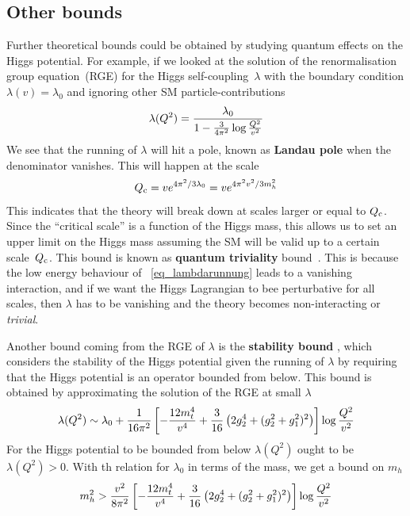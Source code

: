 \subsection{Other bounds}
\par Further theoretical bounds could be obtained by studying quantum effects on the Higgs potential. For example, if we looked at the solution of the renormalisation group equation~(RGE) for the Higgs self-coupling~$\lambda$ with the boundary condition $ \lambda(v)=\lambda_0$ and ignoring other SM particle-contributions
\begin{equation}
	\lambda (Q^2) = \frac{\lambda_0}{1-\frac{3}{4 \pi^2} \log {Q^2\over v^2}}
	\label{eq_lambdarunnung}
\end{equation}
We see that the running of $\lambda$ will hit a pole, known as \textbf{Landau pole} when the denominator vanishes. This will happen at the scale
\begin{equation}
	Q_{{\rm c}} = v e^{4 \pi^2/3 \lambda_0} =  v e^{4 \pi^2 v^2/3 m_h^2}
\end{equation}
This indicates that the theory will break down at scales larger or equal to $ Q_{{\rm c}} $. Since the ``critical scale'' is a function of the Higgs mass, this allows us to set an upper limit on the Higgs mass assuming the SM will be valid up to a certain scale~$ Q_{{\rm c}} $. This bound is known as \textbf{quantum triviality } bound~\cite{Lindner:1985uk}. This is because the low energy behaviour of ~\eqref{eq_lambdarunnung} leads to a vanishing interaction, and if we want the Higgs Lagrangian to bee perturbative for all scales, then $\lambda$ has to be vanishing and the theory becomes non-interacting or \emph{trivial}. 
\par Another bound coming from the RGE of $\lambda$ is the \textbf{stability bound }, which considers the stability of the Higgs potential given the running of $\lambda$  by requiring that the Higgs potential is an operator bounded from below. This bound is obtained by approximating the solution of the RGE at small $\lambda$ 
\begin{equation}
	\lambda(Q^2)\sim \lambda_0 +\frac{1}{16 \pi^2} \left[ - \frac{12m_t^4}{v^4} + \frac{3}{16} \left( 2g_2^4+(g_2^2+g_1^2)^2\right) \right] \log{Q^2\over v^2}
\end{equation}
For the Higgs potential to be bounded from below $\lambda(Q^2)$ ought to be $\lambda(Q^2) > 0$. With th relation for $\lambda_0$ in terms of the mass, we get a bound on $m_h$ 
\begin{equation}
	m_h^2 > \frac{v^2}{8 \pi^2} \left[ - \frac{12m_t^4}{v^4} + \frac{3}{16} \left( 2g_2^4+(g_2^2+g_1^2)^2\right) \right] \log{Q^2\over v^2}
\end{equation}
